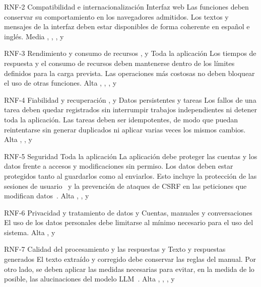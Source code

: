 \requisitoNoFuncional
{RNF-2}
{Compatibilidad e internacionalización}
{}
{Interfaz web}
{Las funciones deben conservar su comportamiento en los navegadores
admitidos. Los textos y mensajes de la interfaz deben estar disponibles de forma
coherente en español e inglés.}
{Media}
{, , ,  y
}

\requisitoNoFuncional
{RNF-3}
{Rendimiento y consumo de recursos}
{,  y }
{Toda la aplicación}
{Los tiempos de respuesta y el consumo de recursos deben mantenerse dentro
de los límites definidos para la carga prevista. Las operaciones más costosas
no deben bloquear el uso de otras funciones.}
{Alta}
{, , ,
 y }

\requisitoNoFuncional
{RNF-4}
{Fiabilidad y recuperación}
{,  y }
{Datos persistentes y tareas}
{Los fallos de una tarea deben quedar registrados sin interrumpir trabajos
independientes ni detener toda la aplicación. Las tareas deben ser idempotentes,
de modo que puedan reintentarse sin generar duplicados ni aplicar varias
veces los mismos cambios.}
{Alta}
{, ,  y }

\requisitoNoFuncional
{RNF-5}
{Seguridad}
{}
{Toda la aplicación}
{La aplicación debe proteger las cuentas y los datos frente a accesos y
modificaciones sin permiso. Los datos deben estar protegidos tanto al
guardarlos como al enviarlos. Esto incluye la protección de las sesiones de
usuario~\cite{owasp_session_management} y la prevención de ataques de
\ac{CSRF} en las peticiones que modifican datos~\cite{owasp_csrf}.}
{Alta}
{, ,  y }

\requisitoNoFuncional
{RNF-6}
{Privacidad y tratamiento de datos}
{ y }
{Cuentas, manuales y conversaciones}
{El uso de los datos personales debe limitarse al mínimo necesario para el
uso del sistema.}
{Alta}
{,  y }


\requisitoNoFuncional
{RNF-7}
{Calidad del procesamiento y las respuestas}
{ y }
{Texto y respuestas generados}
{El texto extraído y corregido debe conservar las reglas del manual.
Por otro lado, se deben aplicar las medidas necesarias para evitar,
en la medida de lo posible, las alucinaciones del modelo \ac{LLM}~\cite{openai_hallucinations}.}
{Alta}
{, , ,
 y }


